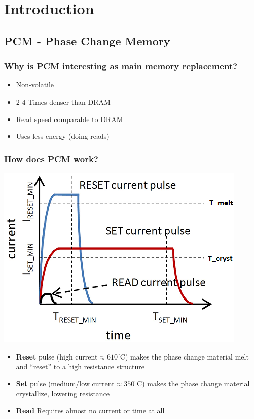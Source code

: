 \section{Introduction}


\subsection{PCM - Phase Change Memory}

\begin{frame}
\frametitle{Why is PCM interesting as main memory replacement?}

\begin{itemize}
\item Non-volatile
\item 2-4 Times denser than DRAM
\item Read speed comparable to DRAM
\item Uses less energy (doing reads)
\end{itemize}

\end{frame}


\begin{frame}
\frametitle{How does PCM work?}

\includegraphics[scale=0.55]{images/set_reset.png}

{\scriptsize
\begin{itemize}
\item \textbf{Reset} pulse (high current$\approx 610^\circ$C) makes the phase change material melt and ``reset'' to a high resistance structure
\item \textbf{Set} pulse (medium/low current$\approx 350^\circ$C) makes the phase change material crystallize, lowering resistance
\item \textbf{Read} Requires almost no current or time at all
\end{itemize}
}
\end{frame}

